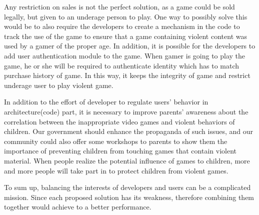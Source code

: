 \textcolor{ProcessBlue}{Any restriction on sales is not the perfect solution, as a game could be sold legally, but given to an underage person to play.} One way to possibly solve this would be to also require the developers to create a mechanism in the code to track the use of the game to ensure that a game containing violent content was used by a gamer of the proper age. In addition, it is possible for the developers to add user authentication module to the game. When gamer is going to play the game, he or she will be required to authenticate identity which has to match purchase history of game. In this way, it keeps the integrity of game and restrict underage user to play violent game.

In addition to the effort of developer to regulate users' behavior in architecture(code) part, it is necessary to improve parents' awareness about the correlation between the inappropriate video games and violent behaviors of children. Our government should enhance the propaganda of such issues, and our community could also offer some workshops to parents to show them the importance of preventing children from touching games that contain violent material. When people realize the potential influence of games to children, more and more people will take part in to protect children from violent games.

To sum up, balancing the interests of developers and users can be a complicated mission. Since each proposed solution has its weakness, therefore combining them together would achieve to a better performance.

